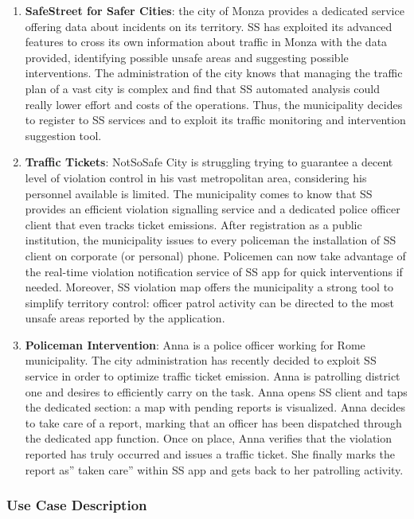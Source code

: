 \begin{enumerate}
	\item \textbf{SafeStreet for Safer Cities}: the city of Monza provides a dedicated service offering data about incidents on its territory. SS has exploited its advanced features to cross its own information about traffic in Monza with the data provided, identifying possible unsafe areas and suggesting possible interventions. The administration of the city knows that managing the traffic plan of a vast city is complex and find that SS automated analysis could really lower effort and costs of the operations. Thus, the municipality decides to register to SS services and to exploit its traffic monitoring and intervention suggestion tool. 
	\item \textbf{Traffic Tickets}: NotSoSafe City is struggling trying to guarantee a decent level of violation control in his vast metropolitan area, considering his personnel available is limited. The municipality comes to know that SS provides an efficient violation signalling service and a dedicated police officer client that even tracks ticket emissions. After registration as a public institution, the municipality issues to every policeman the installation of SS client on corporate (or personal) phone. Policemen can now take advantage of the real-time violation notification service of SS app for quick interventions if needed. Moreover, SS violation map offers the municipality a strong tool to simplify territory control: officer patrol activity can be directed to the most unsafe areas reported by the application.
	\newpage
	\item  \textbf{Policeman Intervention}: Anna is a police officer working for Rome municipality. The city administration has recently decided to exploit SS service in order to optimize traffic ticket emission. Anna is patrolling district one and desires to efficiently carry on the task. Anna opens SS client and taps the dedicated section: a map with pending reports is visualized. Anna decides to take care of a report, marking that an officer has been dispatched  through the dedicated app function. Once on place, Anna verifies that the violation reported has truly occurred and issues a traffic ticket. She finally marks the report as” taken care” within SS app and gets back to her patrolling activity.
	\end{enumerate}
	
	\medskip
	
	\subsubsection{Use Case Description}
	\medskip
	
